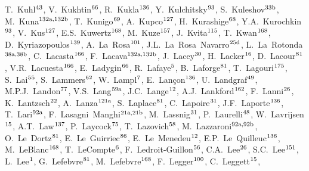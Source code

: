 \begin{flushleft}
T.~Kuhl$^\textrm{\scriptsize 43}$,
V.~Kukhtin$^\textrm{\scriptsize 66}$,
R.~Kukla$^\textrm{\scriptsize 136}$,
Y.~Kulchitsky$^\textrm{\scriptsize 93}$,
S.~Kuleshov$^\textrm{\scriptsize 33b}$,
M.~Kuna$^\textrm{\scriptsize 132a,132b}$,
T.~Kunigo$^\textrm{\scriptsize 69}$,
A.~Kupco$^\textrm{\scriptsize 127}$,
H.~Kurashige$^\textrm{\scriptsize 68}$,
Y.A.~Kurochkin$^\textrm{\scriptsize 93}$,
V.~Kus$^\textrm{\scriptsize 127}$,
E.S.~Kuwertz$^\textrm{\scriptsize 168}$,
M.~Kuze$^\textrm{\scriptsize 157}$,
J.~Kvita$^\textrm{\scriptsize 115}$,
T.~Kwan$^\textrm{\scriptsize 168}$,
D.~Kyriazopoulos$^\textrm{\scriptsize 139}$,
A.~La~Rosa$^\textrm{\scriptsize 101}$,
J.L.~La~Rosa~Navarro$^\textrm{\scriptsize 25d}$,
L.~La~Rotonda$^\textrm{\scriptsize 38a,38b}$,
C.~Lacasta$^\textrm{\scriptsize 166}$,
F.~Lacava$^\textrm{\scriptsize 132a,132b}$,
J.~Lacey$^\textrm{\scriptsize 30}$,
H.~Lacker$^\textrm{\scriptsize 16}$,
D.~Lacour$^\textrm{\scriptsize 81}$,
V.R.~Lacuesta$^\textrm{\scriptsize 166}$,
E.~Ladygin$^\textrm{\scriptsize 66}$,
R.~Lafaye$^\textrm{\scriptsize 5}$,
B.~Laforge$^\textrm{\scriptsize 81}$,
T.~Lagouri$^\textrm{\scriptsize 175}$,
S.~Lai$^\textrm{\scriptsize 55}$,
S.~Lammers$^\textrm{\scriptsize 62}$,
W.~Lampl$^\textrm{\scriptsize 7}$,
E.~Lan\c{c}on$^\textrm{\scriptsize 136}$,
U.~Landgraf$^\textrm{\scriptsize 49}$,
M.P.J.~Landon$^\textrm{\scriptsize 77}$,
V.S.~Lang$^\textrm{\scriptsize 59a}$,
J.C.~Lange$^\textrm{\scriptsize 12}$,
A.J.~Lankford$^\textrm{\scriptsize 162}$,
F.~Lanni$^\textrm{\scriptsize 26}$,
K.~Lantzsch$^\textrm{\scriptsize 22}$,
A.~Lanza$^\textrm{\scriptsize 121a}$,
S.~Laplace$^\textrm{\scriptsize 81}$,
C.~Lapoire$^\textrm{\scriptsize 31}$,
J.F.~Laporte$^\textrm{\scriptsize 136}$,
T.~Lari$^\textrm{\scriptsize 92a}$,
F.~Lasagni~Manghi$^\textrm{\scriptsize 21a,21b}$,
M.~Lassnig$^\textrm{\scriptsize 31}$,
P.~Laurelli$^\textrm{\scriptsize 48}$,
W.~Lavrijsen$^\textrm{\scriptsize 15}$,
A.T.~Law$^\textrm{\scriptsize 137}$,
P.~Laycock$^\textrm{\scriptsize 75}$,
T.~Lazovich$^\textrm{\scriptsize 58}$,
M.~Lazzaroni$^\textrm{\scriptsize 92a,92b}$,
O.~Le~Dortz$^\textrm{\scriptsize 81}$,
E.~Le~Guirriec$^\textrm{\scriptsize 86}$,
E.~Le~Menedeu$^\textrm{\scriptsize 12}$,
E.P.~Le~Quilleuc$^\textrm{\scriptsize 136}$,
M.~LeBlanc$^\textrm{\scriptsize 168}$,
T.~LeCompte$^\textrm{\scriptsize 6}$,
F.~Ledroit-Guillon$^\textrm{\scriptsize 56}$,
C.A.~Lee$^\textrm{\scriptsize 26}$,
S.C.~Lee$^\textrm{\scriptsize 151}$,
L.~Lee$^\textrm{\scriptsize 1}$,
G.~Lefebvre$^\textrm{\scriptsize 81}$,
M.~Lefebvre$^\textrm{\scriptsize 168}$,
F.~Legger$^\textrm{\scriptsize 100}$,
C.~Leggett$^\textrm{\scriptsize 15}$,

\end{flushleft}
